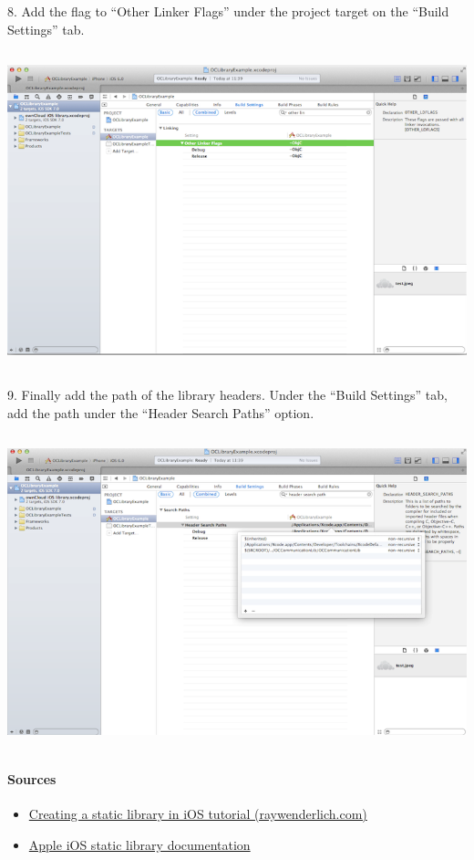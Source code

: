 \documentclass[letterpaper,10pt,english]{sphinxmanual}
\begin{document}
8.  Add the flag  to “Other Linker Flags” under the project target on
the “Build Settings” tab.

\includegraphics[width=14.605cm,height=9.211cm]{100000000000030C000001ECB85120C2.png}

9.  Finally add the path of the library headers.  Under the “Build Settings”
tab, add the path under the “Header Search Paths” option.

\includegraphics[width=14.605cm,height=9.098cm]{100000000000030C000001E637605044.png}


\paragraph{Sources}
\label{ios_library/library_installation:sources}\begin{itemize}
\item {} 
\href{http://www.raywenderlich.com/41377/creating-a-static-library-in-ios-tutorial}{Creating a static library in iOS tutorial (raywenderlich.com)}

\item {} 
\href{https://developer.apple.com/library/ios/technotes/iOSStaticLibraries/Articles/configuration.html\#/apple\_ref/doc/uid/TP40012554-CH3-SW2}{Apple iOS static library documentation}

\end{itemize}
\end{document}
